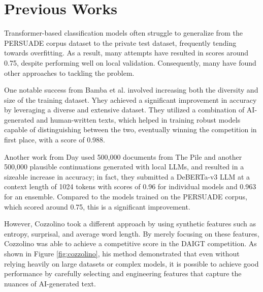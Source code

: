 \documentclass[conference]{IEEEtran}
\begin{document}
\section{Previous Works}

Transformer-based classification models often struggle to generalize from the PERSUADE corpus dataset to the private test dataset, frequently tending towards overfitting. As a result, many attempts have resulted in scores around 0.75, despite performing well on local validation. Consequently, many have found other approaches to tackling the problem.

One notable success from Bamba et al. \cite{1stplace} involved increasing both the diversity and size of the training dataset. Yhey achieved a significant improvement in accuracy by leveraging a diverse and extensive dataset. They utilized a combination of AI-generated and human-written texts, which helped in training robust models capable of distinguishing between the two, eventually winning the competition in first place, with a score of 0.988.

Another work from Day \cite{5thplace} used 500,000 documents from The Pile and another 500,000 plausible continuations generated with local LLMs, and resulted in a sizeable increase in accuracy; in fact, they submitted a DeBERTa-v3 LLM at a context length of 1024 tokens with scores of 0.96 for individual models and 0.963 for an ensemble. Compared to the models trained on the PERSUADE corpus, which scored around 0.75, this is a significant improvement.

However, Cozzolino \cite{6thplace} took a different approach by using synthetic features such as entropy, surprisal, and average word length. By merely focusing on these features, Cozzolino was able to achieve a competitive score in the DAIGT competition. As shown in Figure \ref{fig:cozzolino}, his method demonstrated that even without relying heavily on large datasets or complex models, it is possible to achieve good performance by carefully selecting and engineering features that capture the nuances of AI-generated text.
\end{document}
